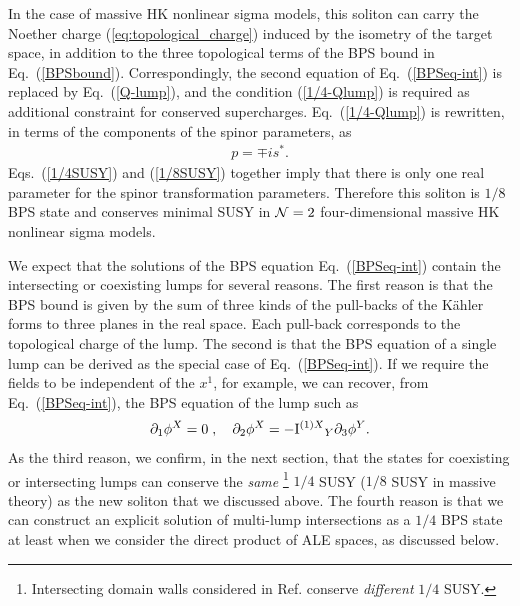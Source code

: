 \documentclass[a4paper,12pt]{article}
\newcommand{\kahler}{K\"{a}hler }
\begin{document}
In the case of massive HK nonlinear sigma models, 
this soliton can carry the Noether charge (\ref{eq:topological_charge}) 
induced by the isometry 
of the target space, in addition to the three topological terms of 
the BPS bound in Eq.~(\ref{BPSbound}). 
Correspondingly, 
the second equation of Eq.~(\ref{BPSeq-int}) is replaced 
by Eq.~(\ref{Q-lump}), and the condition (\ref{1/4-Qlump}) 
is required as additional constraint for conserved supercharges. 
Eq.~(\ref{1/4-Qlump}) is rewritten, in terms of the components of 
the spinor parameters, as 
\begin{eqnarray} 
 p = \mp i s^* .
\label{1/8SUSY}
\end{eqnarray}
Eqs.~(\ref{1/4SUSY}) and (\ref{1/8SUSY}) together imply that there is only 
one real parameter for the spinor transformation parameters. 
Therefore 
this soliton is $1/8$ BPS state and conserves minimal SUSY 
in ${\cal N}=2$ four-dimensional massive HK nonlinear sigma models. 

We expect that the solutions of the BPS equation Eq.~(\ref{BPSeq-int}) 
contain the intersecting or coexisting lumps for several reasons. 
The first reason is 
that the BPS bound is given by the sum of three kinds of the 
pull-backs of the \kahler forms to three planes in the real space. 
Each pull-back corresponds to the topological charge of the lump. 
The second is that the BPS equation of a single lump can be derived as 
the special case of Eq.~(\ref{BPSeq-int}).
If we require the fields to be independent of the $x^1$, for example, 
we can recover, from Eq.~(\ref{BPSeq-int}), the BPS equation of the 
lump such as 
\begin{eqnarray}
  \partial_1\phi^X=0\;,\quad 
  \partial_2\phi^X= - {{\rm I}^{(1)X}}_Y\partial_3\phi^Y.
\end{eqnarray}
As the third reason, we confirm, in the next section, that the states 
for coexisting or intersecting lumps can conserve the {\it same}
\footnote{
Intersecting domain walls considered in Ref.\cite{Townsend1} conserve 
{\it different} $1/4$ SUSY.
} 
 $1/4$ SUSY ($1/8$ SUSY in massive theory) as the new soliton 
 that we discussed above.
The fourth reason is that 
we can construct an explicit solution of 
multi-lump intersections as a $1/4$ BPS state
at least when we consider the direct product of ALE spaces, 
as discussed below.
\end{document}
